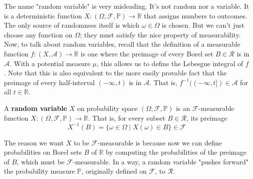   The name "random variable" is very misleading. It's not random nor a variable. It is a deterministic function $X: (\Omega, \mathcal{F}, \mathbb{P}) \longrightarrow \mathbb{R}$ that assigns numbers to outcomes. The only source of randomness itself is which $\omega \in \Omega$ is chosen. But we can't just choose any function on $\Omega$; they must satisfy the nice property of measurability. Now, to talk about random variables, recall that the definition of a measurable function $f: (X, \mathcal{A}) \longrightarrow \mathbb{R}$ is one where the preimage of every Borel set $B \in \mathcal{R}$ is in $\mathcal{A}$. With a potential measure $\mu$, this allows us to define the Lebesgue integral of $f$. Note that this is also equivalent to the more easily provable fact that the preimage of every half-interval $(-\infty, t)$ is in $\mathcal{A}$. That is, $f^{-1}((-\infty, t]) \in \mathcal{A}$ for all $t \in \mathbb{R}$. 

  \begin{definition}
    A \textbf{random variable} $X$ on probability space $(\Omega, \mathcal{F}, \mathbb{P})$ is an $\mathcal{F}$-measurable function $X: (\Omega, \mathcal{F}, \mathbb{P}) \longrightarrow \mathbb{R}$. That is, for every subset $B \in \mathcal{R}$, its preimage 
    \begin{equation}
      X^{-1} (B) = \{\omega \in \Omega \mid X(\omega) \in B\} \in \mathcal{F}
    \end{equation}
  \end{definition}

  The reason we want $X$ to be $\mathcal{F}$-measurable is because now we can define probabilities on Borel sets $B$ of $\mathbb{R}$ by computing the probabilities of the preimage of $B$, which must be $\mathcal{F}$-measurable. In a way, a random variable "pushes forward" the probability measure $\mathbb{P}$, originally defined on $\mathcal{F}$, to $\mathcal{R}$.  

